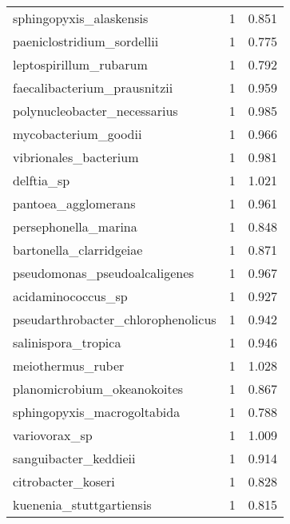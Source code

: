 \begin{tabular}{lrr}
                     sphingopyxis\_alaskensis &                   1 &     0.851 \\
                  paeniclostridium\_sordellii &                   1 &     0.775 \\
                      leptospirillum\_rubarum &                   1 &     0.792 \\
                faecalibacterium\_prausnitzii &                   1 &     0.959 \\
                polynucleobacter\_necessarius &                   1 &     0.985 \\
                        mycobacterium\_goodii &                   1 &     0.966 \\
                       vibrionales\_bacterium &                   1 &     0.981 \\
                                  delftia\_sp &                   1 &     1.021 \\
                         pantoea\_agglomerans &                   1 &     0.961 \\
                        persephonella\_marina &                   1 &     0.848 \\
                     bartonella\_clarridgeiae &                   1 &     0.871 \\
               pseudomonas\_pseudoalcaligenes &                   1 &     0.967 \\
                          acidaminococcus\_sp &                   1 &     0.927 \\
          pseudarthrobacter\_chlorophenolicus &                   1 &     0.942 \\
                         salinispora\_tropica &                   1 &     0.946 \\
                           meiothermus\_ruber &                   1 &     1.028 \\
                 planomicrobium\_okeanokoites &                   1 &     0.867 \\
                 sphingopyxis\_macrogoltabida &                   1 &     0.788 \\
                               variovorax\_sp &                   1 &     1.009 \\
                       sanguibacter\_keddieii &                   1 &     0.914 \\
                          citrobacter\_koseri &                   1 &     0.828 \\
                    kuenenia\_stuttgartiensis &                   1 &     0.815 \\

\end{tabular}
